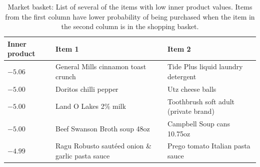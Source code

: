 \documentclass[12pt]{article}
\begin{document}
\begin{table}[h]
	\centering
  \scriptsize
	\begin{tabular}{lll}\toprule
		Inner product & Item 1 & Item 2 \\ \hline
    $-5.06$ & General Mills cinnamon toast crunch & Tide Plus liquid laundry detergent \\
    $-5.00$ & Doritos chilli pepper & Utz cheese balls \\
    $-5.00$ & Land O Lakes 2\% milk & Toothbrush soft adult (private brand) \\
    $-5.00$ & Beef Swanson Broth soup 48oz & Campbell Soup cans 10.75oz \\
    $-4.99$ & Ragu Robusto saut\'{e}ed onion \& garlic pasta sauce & Prego tomato Italian pasta sauce \\
    \bottomrule
	\end{tabular}
	\caption{Market basket: List of several of the items with low inner product values. Items from the first column have lower probability of being purchased when the item in the second column is in the shopping basket.\label{tab:iri_low_inner_prod}}
\end{table}

\newpage
\end{document}
